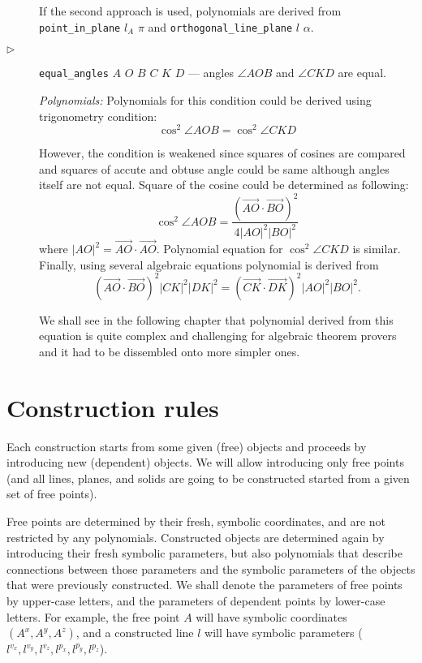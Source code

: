 \documentclass[final,1p,times,authoryear]{elsarticle}
\begin{document}
\begin{description}
If the second approach is used, polynomials are derived from {\tt
  point\_in\_plane} $l_A$ $\pi$ and {\tt orthogonal\_line\_plane} $l$
$\alpha$.

\item[$\triangleright$] {\tt equal\_angles} $A$ $O$ $B$ $C$ $K$ $D$ --- angles $\angle AOB$ and $\angle
CKD$ are equal.

{\em Polynomials:} Polynomials for this condition could be derived
using trigonometry condition:
$$\cos^2{\angle AOB} = \cos^2{\angle CKD}$$

However, the condition is weakened since squares of cosines are
compared and squares of accute and obtuse angle could be same although
angles itself are not equal. Square of the cosine could be determined as following:
$$\cos^2{\angle AOB} = \frac{(\overrightarrow{AO}\cdot
  \overrightarrow{BO})^2}{4|AO|^2|BO|^2}$$ where $|AO|^2 =
\overrightarrow{AO}\cdot \overrightarrow{AO}$.  Polynomial equation
for $\cos^2{\angle CKD}$ is similar. Finally, using several algebraic
equations polynomial is derived from
$$(\overrightarrow{AO}\cdot  \overrightarrow{BO})^2|CK|^2|DK|^2 = (\overrightarrow{CK}\cdot  \overrightarrow{DK})^2|AO|^2|BO|^2.$$

We shall see in the following chapter that polynomial derived from
this equation is quite complex and challenging for algebraic theorem
provers and it had to be dissembled onto more simpler ones.

\end{description}

\section{Construction rules}


Each construction starts from some given (free) objects and proceeds
by introducing new (dependent) objects. We will allow introducing only
free points (and all lines, planes, and solids are going to be
constructed started from a given set of free points).

Free points are determined by their fresh, symbolic coordinates, and
are not restricted by any polynomials. Constructed objects are
determined again by introducing their fresh symbolic parameters, but
also polynomials that describe connections between those parameters
and the symbolic parameters of the objects that were previously
constructed. We shall denote the parameters of free points by
upper-case letters, and the parameters of dependent points by
lower-case letters. For example, the free point $A$ will have symbolic
coordinates $({A}^x, {A}^y, {A}^z)$, and a constructed line $l$ will
have symbolic parameters (${l}^{v_x}, {l}^{v_y}, {l}^{v_z}, {l}^{p_x},
{l}^{p_y}, {l}^{p_z}$).
\end{document}
